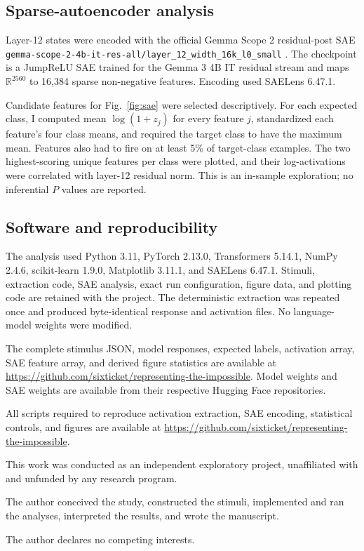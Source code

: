 \documentclass[pdflatex,sn-nature]{sn-jnl}
\begin{document}
\subsection{Sparse-autoencoder analysis}

Layer-12 states were encoded with the official Gemma Scope 2 residual-post SAE \texttt{gemma-scope-2-4b-it-res-all/layer\_12\_width\_16k\_l0\_small} \cite{mcdougall2025}. The checkpoint is a JumpReLU SAE trained for the Gemma 3 4B IT residual stream and maps $\mathbb{R}^{2560}$ to 16,384 sparse non-negative features. Encoding used SAELens 6.47.1.

Candidate features for Fig.~\ref{fig:sae} were selected descriptively. For each expected class, I computed mean $\log(1+z_j)$ for every feature $j$, standardized each feature's four class means, and required the target class to have the maximum mean. Features also had to fire on at least 5\% of target-class examples. The two highest-scoring unique features per class were plotted, and their log-activations were correlated with layer-12 residual norm. This is an in-sample exploration; no inferential $P$ values are reported.

\subsection{Software and reproducibility}

The analysis used Python 3.11, PyTorch 2.13.0, Transformers 5.14.1, NumPy 2.4.6, scikit-learn 1.9.0, Matplotlib 3.11.1, and SAELens 6.47.1. Stimuli, extraction code, SAE analysis, exact run configuration, figure data, and plotting code are retained with the project. The deterministic extraction was repeated once and produced byte-identical response and activation files. No language-model weights were modified.

\backmatter


The complete stimulus JSON, model responses, expected labels, activation array, SAE feature array, and derived figure statistics are available at \url{https://github.com/sixticket/representing-the-impossible}. Model weights and SAE weights are available from their respective Hugging Face repositories.


All scripts required to reproduce activation extraction, SAE encoding, statistical controls, and figures are available at \url{https://github.com/sixticket/representing-the-impossible}.


This work was conducted as an independent exploratory project, unaffiliated with and unfunded by any research program.


The author conceived the study, constructed the stimuli, implemented and ran the analyses, interpreted the results, and wrote the manuscript.


The author declares no competing interests.

\setlength{\bibsep}{2pt}

\end{document}
